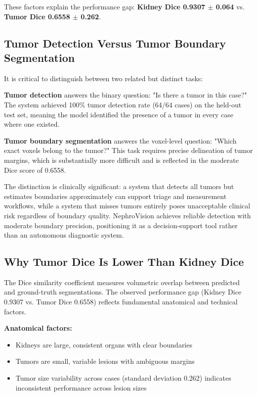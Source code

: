 These factors explain the performance gap: \textbf{Kidney Dice 0.9307 $\pm$ 0.064} vs. \textbf{Tumor Dice 0.6558 $\pm$ 0.262}.

\subsection{Tumor Detection Versus Tumor Boundary Segmentation}

It is critical to distinguish between two related but distinct tasks:

\textbf{Tumor detection} answers the binary question: "Is there a tumor in this case?" The system achieved 100\% tumor detection rate (64/64 cases) on the held-out test set, meaning the model identified the presence of a tumor in every case where one existed.

\textbf{Tumor boundary segmentation} answers the voxel-level question: "Which exact voxels belong to the tumor?" This task requires precise delineation of tumor margins, which is substantially more difficult and is reflected in the moderate Dice score of 0.6558.

The distinction is clinically significant: a system that detects all tumors but estimates boundaries approximately can support triage and measurement workflows, while a system that misses tumors entirely poses unacceptable clinical risk regardless of boundary quality. NephroVision achieves reliable detection with moderate boundary precision, positioning it as a decision-support tool rather than an autonomous diagnostic system.

\subsection{Why Tumor Dice Is Lower Than Kidney Dice}

The Dice similarity coefficient measures volumetric overlap between predicted and ground-truth segmentations. The observed performance gap (Kidney Dice 0.9307 vs. Tumor Dice 0.6558) reflects fundamental anatomical and technical factors.

\textbf{Anatomical factors:}
\begin{itemize}
    \item Kidneys are large, consistent organs with clear boundaries
    \item Tumors are small, variable lesions with ambiguous margins
    \item Tumor size variability across cases (standard deviation 0.262) indicates inconsistent performance across lesion sizes
\end{itemize}

